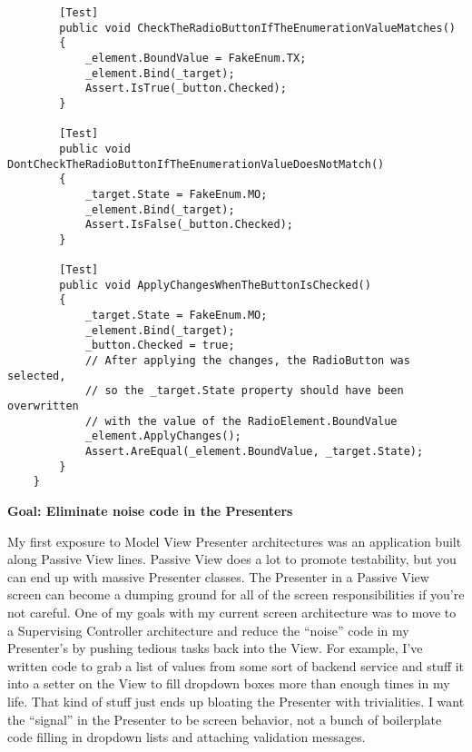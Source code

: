 \documentclass{article}
\begin{document}
{\begin{lstlisting}
        [Test]
        public void CheckTheRadioButtonIfTheEnumerationValueMatches()
        {
            _element.BoundValue = FakeEnum.TX;
            _element.Bind(_target);
            Assert.IsTrue(_button.Checked);
        } 

        [Test]
        public void DontCheckTheRadioButtonIfTheEnumerationValueDoesNotMatch()
        {
            _target.State = FakeEnum.MO;
            _element.Bind(_target);
            Assert.IsFalse(_button.Checked);
        }

        [Test]
        public void ApplyChangesWhenTheButtonIsChecked()
        {
            _target.State = FakeEnum.MO;
            _element.Bind(_target);
            _button.Checked = true; 
            // After applying the changes, the RadioButton was selected,
            // so the _target.State property should have been overwritten
            // with the value of the RadioElement.BoundValue
            _element.ApplyChanges();
            Assert.AreEqual(_element.BoundValue, _target.State);
        }
    }
\end{lstlisting}

\Large {\textbf{Goal:  Eliminate noise code in the Presenters}}

My first exposure to Model View Presenter architectures was an application built along Passive View lines.  Passive View does a lot to promote testability, but you can end up with massive Presenter classes.  The Presenter in a Passive View screen can become a dumping ground for all of the screen responsibilities if you're not careful.  One of my goals with my current screen architecture was to move to a Supervising Controller architecture and reduce the “noise” code in my Presenter's by pushing tedious tasks back into the View.  For example, I've written code to grab a list of values from some sort of backend service and stuff it into a setter on the View to fill dropdown boxes more than enough times in my life.  That kind of stuff just ends up bloating the Presenter with trivialities.  I want the “signal” in the Presenter to be screen behavior, not a bunch of boilerplate code filling in dropdown lists and attaching validation messages. 

}
\end{document}
